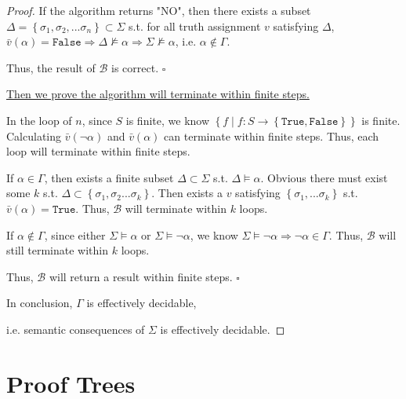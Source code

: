 \documentclass{article}
\newcommand{\set}[1]{\left\{#1\right\}}
\newcommand{\whiteqed}{\hfill $\square$\par}
\begin{document}
\begin{proof}
    \hspace{1.3em}
    If the algorithm returns "NO", then there exists a subset $\Delta=\set{\sigma_1,\sigma_2,...\sigma_n}\subset\Sigma$ s.t. for all truth assignment $v$ satisfying $\Delta$, $\bar{v}(\alpha)=\mathtt{False}\Longrightarrow\Delta\nvDash\alpha\Longrightarrow\Sigma\nvDash\alpha$, i.e. $\alpha\notin\Gamma$.

    \hspace{1.3em}
    Thus, the result of $\mathcal{B}$ is correct. \whiteqed

    \vspace{1em}\hspace{1.3em}
    \underline{Then we prove the algorithm will terminate within finite steps.}

    \hspace{1.3em}
    In the loop of $n$, since $S$ is finite, we know $\set{f\mid f:S\to\set{\mathtt{True},\mathtt{False}}}$ is finite. Calculating $\bar{v}(\neg\alpha)$ and $\bar{v}(\alpha)$ can terminate within finite steps. Thus, each loop will terminate within finite steps.
    
    \hspace{1.3em}
    If $\alpha\in\Gamma$, then exists a finite subset $\Delta\subset\Sigma$ s.t. $\Delta\vDash\alpha$. Obvious there must exist some $k$ s.t. $\Delta\subset\set{\sigma_1,\sigma_2...\sigma_k}$. Then exists a $v$ satisfying $\set{\sigma_1,...\sigma_k}$ s.t. $\bar{v}(\alpha)=\mathtt{True}$. Thus, $\mathcal{B}$ will terminate within $k$ loops.

    \hspace{1.3em}
    If $\alpha\notin\Gamma$, since either $\Sigma\vDash\alpha$ or $\Sigma\vDash\neg\alpha$, we know $\Sigma\vDash\neg\alpha\Longrightarrow\neg\alpha\in\Gamma$. Thus, $\mathcal{B}$ will still terminate within $k$ loops.

    \hspace{1.3em}
    Thus, $\mathcal{B}$ will return a result within finite steps. \whiteqed

    \vspace{1em} \hspace{1.3em}
    In conclusion, $\Gamma$ is effectively decidable, 
    
    \hspace{1.3em}
    i.e. semantic consequences of $\Sigma$ is effectively decidable.
\end{proof}

\vspace{1em}
\section{Proof Trees}
\vspace{1em}
\end{document}
